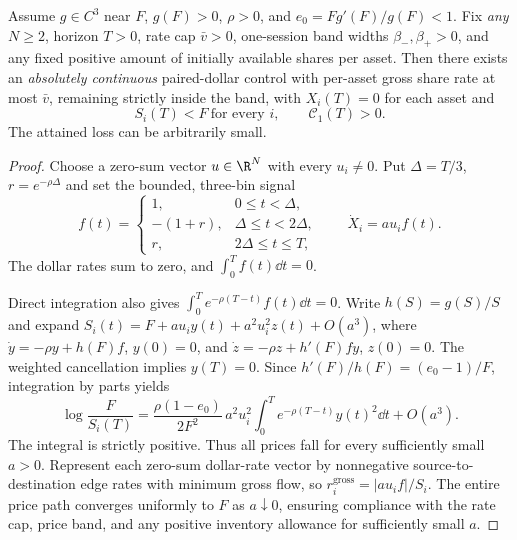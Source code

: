 \documentclass[review,hidelinks,onefignum,onetabnum]{siamonline250211}
\begin{document}
\begin{theorem}\label{thm:finite-rate-construct}
Assume $g\in C^3$ near $F$, $g(F)>0$, $\rho>0$, and $e_0=Fg'(F)/g(F)<1$. Fix \emph{any} $N\ge2$, horizon $T>0$, rate cap $\bar v>0$, one-session band widths $\beta_-,\beta_+>0$, and any fixed positive amount of initially available shares per asset. Then there exists an \emph{absolutely continuous} paired-dollar control with per-asset gross share rate at most $\bar v$, remaining strictly inside the band, with $X_i(T)=0$ for each asset and
\begin{equation}\label{eq:local-speed-crash}
 \ S_i(T)<F\ \text{for every }i,\qquad \mathcal C_1(T)>0.\ 
\end{equation}
The attained loss can be arbitrarily small.
\end{theorem}
\begin{proof}
Choose a zero-sum vector $u\in\R^N$ with every $u_i\ne0$. Put $\Delta=T/3$, $r=e^{-\rho\Delta}$ and set the bounded, three-bin signal
\begin{equation}\label{eq:bounded-control}
 f(t)=
 \begin{cases}
 1,&0\le t<\Delta,\\
 -(1+r),&\Delta\le t<2\Delta,\\
 r,&2\Delta\le t\le T,
 \end{cases}
 \qquad \dot X_i=a u_i f(t).
\end{equation}
The dollar rates sum to zero, and $\int_0^T f(t)\dd t=0$.
\par
Direct integration also gives $\int_0^T e^{-\rho(T-t)}f(t)\dd t=0$.
Write $h(S)=g(S)/S$ and expand
$S_i(t)=F+a u_i y(t)+a^2u_i^2 z(t)+O(a^3)$,
where $\dot y=-\rho y+h(F)f$, $y(0)=0$, and
$\dot z=-\rho z+h'(F)f y$, $z(0)=0$.
The weighted cancellation implies $y(T)=0$. Since $h'(F)/h(F)=(e_0-1)/F$, integration by parts yields
\begin{equation}\label{eq:finite-rate-coefficient}
 \ \log\frac{F}{S_i(T)}=
 \frac{\rho(1-e_0)}{2F^2}\,a^2u_i^2
 \int_0^T e^{-\rho(T-t)}y(t)^2\dd t+O(a^3).\ 
\end{equation}
The integral is strictly positive. Thus all prices fall for every sufficiently small $a>0$. Represent each zero-sum dollar-rate vector by nonnegative source-to-destination edge rates with minimum gross flow, so $r_i^{\mathrm{gross}}=|a u_i f|/S_i$. The entire price path converges uniformly to $F$ as $a\downarrow0$, ensuring compliance with the rate cap, price band, and any positive inventory allowance for sufficiently small $a$.
\end{proof}
\end{document}

